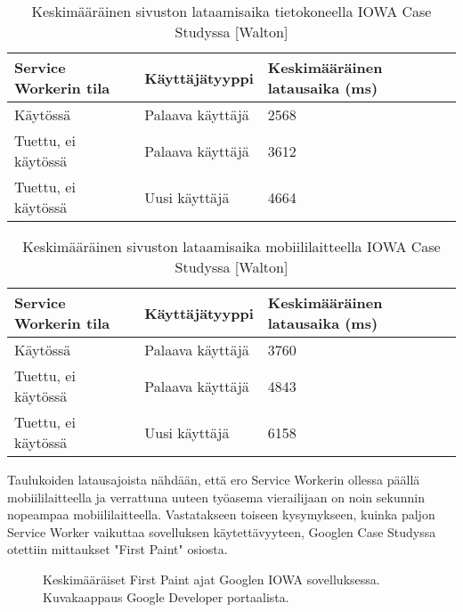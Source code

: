 \documentclass{tktltiki}
\begin{document}
\begin{table}[h]
\centering
\begin{small}
\caption{Keskimääräinen sivuston lataamisaika tietokoneella IOWA Case Studyssa [Walton] }
\begin{tabular}{|L{5cm}|L{5cm}|L{5cm}|}
\hline
\textbf{Service Workerin tila} & 
\textbf{Käyttäjätyyppi} &
\textbf{Keskimääräinen latausaika (ms)}
\\ \hline
Käytössä & 
Palaava käyttäjä &
2568
\\ \hline
Tuettu, ei käytössä & 
Palaava käyttäjä &
3612
\\ \hline
Tuettu, ei käytössä & 
Uusi käyttäjä &
4664
\\ \hline
\end{tabular}
\label{table:loading time on pc}
\end{small}
\end{table}

\clearpage

\begin{table}[h]
\centering
\begin{small}
\caption{Keskimääräinen sivuston lataamisaika mobiililaitteella IOWA Case Studyssa [Walton] }
\begin{tabular}{|L{5cm}|L{5cm}|L{5cm}|}
\hline
\textbf{Service Workerin tila} & 
\textbf{Käyttäjätyyppi} &
\textbf{Keskimääräinen latausaika (ms)}
\\ \hline
Käytössä & 
Palaava käyttäjä &
3760
\\ \hline
Tuettu, ei käytössä & 
Palaava käyttäjä &
4843
\\ \hline
Tuettu, ei käytössä & 
Uusi käyttäjä &
6158
\\ \hline
\end{tabular}
\label{table:loading time on mobile}
\end{small}
\end{table}


Taulukoiden latausajoista nähdään, että ero Service Workerin ollessa päällä mobiililaitteella ja verrattuna uuteen työasema vierailijaan on noin sekunnin nopeampaa mobiililaitteella. Vastatakseen toiseen kysymykseen, kuinka paljon Service Worker vaikuttaa sovelluksen käytettävyyteen, Googlen Case Studyssa otettiin mittaukset "First Paint" osiosta.

\begin{figure}[!h]
\begin{center}
\caption{Keskimääräiset First Paint ajat Googlen IOWA sovelluksessa. Kuvakaappaus Google Developer portaalista.}
\label{Google AVG load times 1}
\end{center}
\end{figure}
\end{document}
